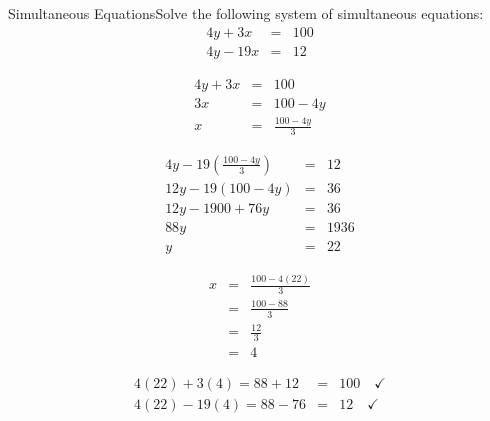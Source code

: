\documentclass[10pt,a4paper,titlepage,twoside,openright]{report}
\begin{document}
\begin{wex}{Simultaneous Equations}{Solve the following system of simultaneous equations:
\begin{eqnarray*}
4y+3x&=&100\\
4y-19x&=&12
\end{eqnarray*}}
{

\begin{eqnarray*}
4y+3x&=&100\\
3x&=&100-4y\\
x&=&\frac{100-4y}{3}
\end{eqnarray*}

\begin{eqnarray*}
4y-19(\frac{100-4y}{3})&=&12\\
12y-19(100-4y)&=&36\\
12y-1900+76y&=&36\\
88y&=&1936\\
y&=&22
\end{eqnarray*}

\begin{eqnarray*}
x&=&\frac{100-4(22)}{3}\\
&=&\frac{100-88}{3}\\
&=&\frac{12}{3}\\
&=&4
\end{eqnarray*}

\begin{eqnarray*}
4(22)+3(4)=88+12&=&100 \quad \checkmark\\
4(22)-19(4)=88-76&=&12 \quad \checkmark
\end{eqnarray*}}
\end{wex}
\end{document}
